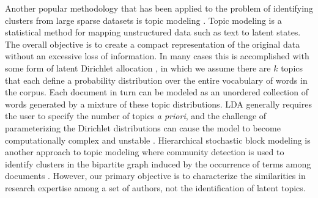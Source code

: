 \documentclass[12pt]{article}
\begin{document}



Another popular methodology that has been applied to the problem of identifying clusters from large sparse datasets is topic modeling \citep{yan2012overlaying, yau2014clustering}.
Topic modeling is a statistical method for mapping unstructured data such as text to latent states.
The overall objective is to create a compact representation of the original data without an excessive loss of information.
In many cases this is accomplished with some form of latent Dirichlet allocation \citep[LDA;][]{blei2003latent}, in which we assume there are $k$ topics that each define a probability distribution over the entire vocabulary of words in the corpus.
Each document in turn can be modeled as an unordered collection of words generated by a mixture of these topic distributions.
LDA generally requires the user to specify the number of topics \textit{a priori}, and the challenge of parameterizing the Dirichlet distributions can cause the model to become computationally complex and unstable \citep{vayansky2020review}.
Hierarchical stochastic block modeling is another approach to topic modeling where community detection is used to identify clusters in the bipartite graph induced by the occurrence of terms among documents \citep{gerlach2018network}.
However, our primary objective is to characterize the similarities in research expertise among a set of authors, not the identification of latent topics.

\end{document}
